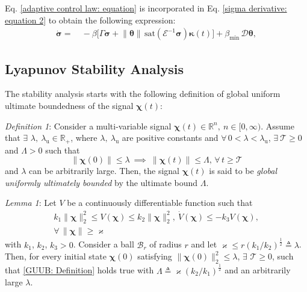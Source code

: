 \documentclass[lettersize,journal]{IEEEtran}
\begin{document}
Eq. \eqref{adaptive control law: equation} is incorporated in Eq. \eqref{sigma derivative: equation 2} to obtain the following expression:
\begin{align}
    \label{sigma derivative: equation 3}
    \dot{\boldsymbol{\sigma}} =&~ - \beta \big[\Gamma \boldsymbol{\sigma} + \lVert \boldsymbol{\theta} \rVert \, \text{sat}( \mathcal{E}^{-1}\boldsymbol{\sigma}) \boldsymbol{\kappa}(t)\big] + \beta_{\min} \, \mathcal{D} \boldsymbol{\theta},
\end{align}

\subsection{Lyapunov Stability Analysis}
The stability analysis starts with the following definition of global uniform ultimate boundedness of the signal $\boldsymbol{\chi}(t)$:

\textit{Definition 1}:
 Consider a multi-variable signal $\boldsymbol{\chi}(t) \in \mathbb{R}^n, ~n \in [0, \infty)$. Assume that $\exists$ $\lambda, ~ \lambda_{\text{u}} \in \mathbb{R}_+$, where $\lambda, ~ \lambda_{\text{u}}$ are positive constants and $\forall \, 0 < \lambda < \lambda_{\text{u}}$, $\exists ~ \mathcal{T} \geq 0$ and $\Lambda > 0$ such that
\begin{equation} \label{GUUB: Definition}
    \lVert \boldsymbol{\chi}(0) \rVert \leq \lambda ~\implies~ \lVert \boldsymbol{\chi}(t) \rVert \leq \Lambda,  \, \forall \, t \geq \mathcal{T}
\end{equation}
\noindent and $\lambda$ can be arbitrarily large. Then, the signal $\boldsymbol{\chi}(t)$ is said to be \textit{global uniformly ultimately bounded} by the ultimate bound $\Lambda$.

\textit{Lemma 1}:
Let $V$ be a continuously differentiable function such that 
\begin{align}
    k_1 \lVert \boldsymbol{\chi} \rVert^2_2 \leq V(\boldsymbol{\chi}) \leq k_2 \lVert \boldsymbol{\chi} \rVert^2_2, ~ \dot{V}(\boldsymbol{\chi}) \leq - k_3 V(\boldsymbol{\chi}),\\ \forall \, \lVert \boldsymbol{\chi} \rVert \geq \varkappa \nonumber
\end{align}
\noindent with $k_1$, $k_2$, $k_3 > 0$. Consider a ball $\mathcal{B}_r$ of radius $r$ and let $\varkappa \leq r (k_1/k_2)^{\frac{1}{2}} \triangleq \lambda$.
\noindent Then, for every initial state $\boldsymbol{\chi}(0)$ satisfying $\lVert \boldsymbol{\chi}(0) \rVert^2_2 \leq \lambda$, $\exists$ $\mathcal{T} \geq 0$, such that \eqref{GUUB: Definition} holds true with $\Lambda \triangleq \varkappa (k_2/k_1)^{\frac{1}{2}}$ and an arbitrarily large $\lambda$. 
\end{document}
